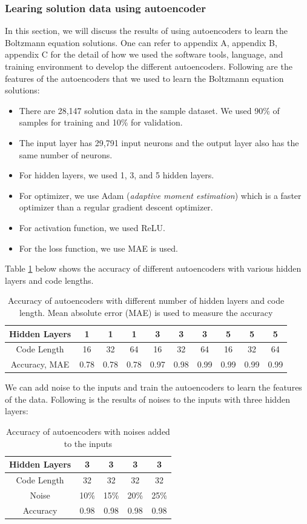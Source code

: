 \documentclass{article}
\begin{document}
\subsubsection{Learing solution data using autoencoder}
In this section, we will discuss the results of using autoencoders to learn the Boltzmann equation solutions. One can refer to appendix A, appendix B, appendix C for the detail of how we used the software tools, language, and training environment to develop the different autoencoders. Following are the features of the autoencoders that we used to learn the Boltzmann equation solutions:
\begin{itemize}
	\item There are 28,147 solution data in the sample dataset. We used 90\% of samples for training and 10\% for validation.
	\item The input layer has 29,791 input neurons and the output layer also has the same number of neurons.
	\item For hidden layers, we used 1, 3, and 5 hidden layers.
	\item For optimizer, we use Adam (\emph{adaptive moment estimation}) which is a faster optimizer than a regular gradient descent optimizer.
	\item For activation function, we used ReLU.
	\item For the loss function, we use MAE is used.
\end{itemize}
Table \ref{table:ae} below shows the accuracy of different autoencoders with various hidden layers and code lengths.

\begin{table} [h!]
\centering
\begin{tabular}{c|c|c|c|c|c|c|c|c|c}
	Hidden Layers & 1 & 1 & 1 & 3 & 3 & 3 & 5 & 5 & 5 \\
	\hline
	Code Length & 16 & 32 & 64 & 16 & 32 & 64 & 16 & 32 & 64 \\
	\hline
	Accuracy, MAE & 0.78 & 0.78 & 0.78 & 0.97 & 0.98 & 0.99 & 0.99 & 0.99 & 0.99
\end{tabular}
\caption{Accuracy of autoencoders with different number of hidden layers and code length. Mean absolute error (MAE) is used to measure the accuracy}
\label{table:ae}
\end{table}

We can add noise to the inputs and train the autoencoders to learn the features of the data. Following is the results of noises to the inputs with three hidden layers: 
\begin{table} [h!]
\centering
\begin{tabular}{c|c|c|c|c}
	Hidden Layers & 3 & 3 & 3 & 3 \\
	\hline 
	Code Length & 32 & 32 & 32 & 32 \\
	\hline
	Noise & 10\% & 15\% & 20\% & 25\% \\ 
	\hline
	Accuracy & 0.98 & 0.98 & 0.98 & 0.98
\end{tabular}
\caption{Accuracy of autoencoders with noises added to the inputs}
\label{table:ae_noise}
\end{table}
\end{document}
